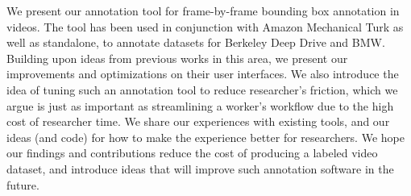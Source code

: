 We present our annotation tool for frame-by-frame bounding box annotation in videos.
The tool has been used in conjunction with Amazon Mechanical Turk as well as standalone, to annotate datasets for Berkeley Deep Drive and BMW.
Building upon ideas from previous works in this area, we present our improvements and optimizations on their user interfaces.
We also introduce the idea of tuning such an annotation tool to reduce researcher's friction, which we argue is just as important as streamlining a worker's workflow due to the high cost of researcher time.
We share our experiences with existing tools, and our ideas (and code) for how to make the experience better for researchers.
We hope our findings and contributions reduce the cost of producing a labeled video dataset, and introduce ideas that will improve such annotation software in the future.
